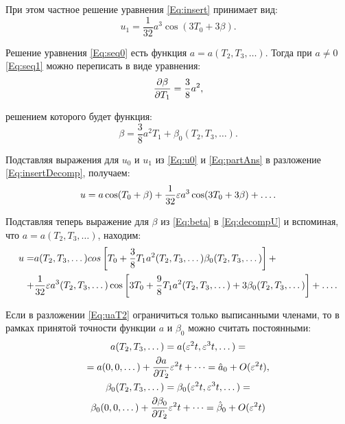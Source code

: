При этом частное решение уравнения \eqref{Eq:insert} принимает вид:
\begin{equation} \label{Eq:partAns}
    u_1 = \frac{1}{32} a^3 \cos(3 T_0 + 3 \beta). 
\end{equation}

Решение уравнения \eqref{Eq:seq0} есть функция
$a = a(T_2, T_3, \dots)$.
Тогда при $a \ne 0$ \eqref{Eq:seq1} можно переписать в виде уравнения:
\begin{equation*}
    \pdv{\beta}{T_1} = \frac{3}{8} a^2, 
\end{equation*}

решением которого будет функция:
\begin{equation} \label{Eq:beta}
    \beta = \frac{3}{8} a^2 T_1 + \beta_0(T_2, T_3, \dots). 
\end{equation}

Подставляя выражения для $u_0$ и $u_1$ из \eqref{Eq:u0}
и \eqref{Eq:partAns} в разложение \eqref{Eq:insertDecomp}, получаем:
\begin{equation} \label{Eq:decompU}
    u = a \cos(T_0 + \beta) + \frac{1}{32} \varepsilon a^3 \cos(3 T_0 + 3 \beta) + \dots. 
\end{equation}

Подставляя теперь выражение для $\beta$ из \eqref{Eq:beta} в \eqref{Eq:decompU}
и вспоминая, что $a = a(T_2, T_3, \dots)$, находим:
\begin{align}
    u = & a(T_2, T_3, \dots) cos\left[ T_0 +
    \frac{3}{8} T_1 a^2(T_2, T_3, \dots)
    \beta_0(T_2, T_3, \dots) \right] + \nonumber \\
    + & \frac{1}{32} \varepsilon a^3(T_2, T_3, \dots) \cos\left[ 3 T_0 + 
    \frac{9}{8} T_1 a^2(T_2, T_3, \dots) +
    3 \beta_0(T_2, T_3, \dots) \right] + \dots.  \label{Eq:uaT2}
\end{align}

Если в разложении \eqref{Eq:uaT2} ограничиться только выписанными членами,
то в рамках принятой точности функции $a$ и $\beta_0$ можно считать постоянными:
\begin{equation*}
    \begin{gathered}
        a(T_2, T_3, \dots) = a(\varepsilon^2 t, \varepsilon^3 t, \dots) = \\
        = a(0, 0, \dots) + \pdv{a}{T_2} \varepsilon^2 t + \dots = \hat{a}_0 + O(\varepsilon^2 t), \\
        \beta_0(T_2, T_3, \dots) = \beta_0(\varepsilon^2 t, \varepsilon^3 t, \dots) = \\
        \beta_0(0, 0, \dots) + \pdv{\beta_0}{T_2} \varepsilon^2 t + \dots =
        \hat{\beta}_0 + O(\varepsilon^2 t)
    \end{gathered}
\end{equation*}

